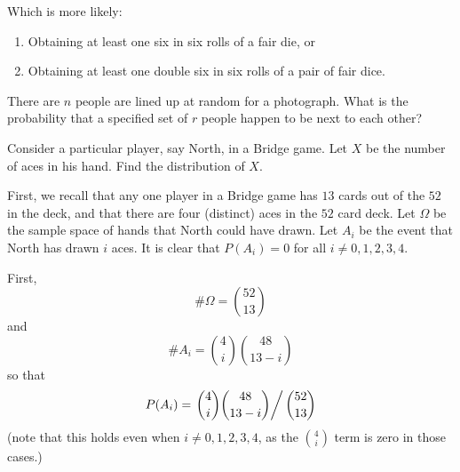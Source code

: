 \begin{solution}
\end{solution}
\newpage

\begin{problem}
  Which is more likely:
  \begin{enumerate}[label=(\alph*),noitemsep]
  \item Obtaining at least one six in six rolls of a fair die, or
  \item Obtaining at least one double six in six rolls of a pair of fair
    dice.
  \end{enumerate}
\end{problem}
\begin{solution}
\end{solution}
\newpage

\begin{problem}
  There are \(n\) people are lined up at random for a photograph. What is
  the probability that a specified set of \(r\) people happen to be next to
  each other?
\end{problem}
\begin{solution}
\end{solution}
\newpage

\begin{problem}[Handout 1, \# 16]
  Consider a particular player, say North, in a Bridge game. Let \(X\) be
  the number of aces in his hand. Find the distribution of \(X\).
\end{problem}
\begin{solution}
  First, we recall that any one player in a Bridge game has \(13\) cards
  out of the \(52\) in the deck, and that there are four (distinct) aces in
  the \(52\) card deck. Let \(\Omega\) be the sample space of hands that
  North could have drawn. Let \(A_i\) be the event that North has drawn
  \(i\) aces. It is clear that \(P(A_i) = 0\) for all \(i \neq 0,1,2,3,4\).

  First,
  \[
    \# \Omega= \binom{52}{13}
  \]
  and
  \[
    \# A_i= \binom{4}{i} \binom{48}{13-i}
  \]
  so that
  \[
    P(A_i)=\left.\binom{4}{i}\binom{48}{13-i}\right/\binom{52}{13}
  \]
  (note that this holds even when \(i \neq 0,1,2,3,4\), as the
  \(\displaystyle\binom{4}{i}\) term is zero in those cases.)
\end{solution}
\newpage


